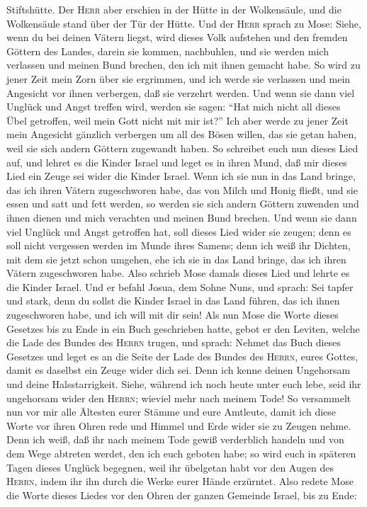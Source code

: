 Stiftshütte.  Der \textsc{Herr} aber erschien in der
Hütte in der Wolkensäule, und die Wolkensäule stand über der Tür der
Hütte.  Und der \textsc{Herr} sprach zu Mose: Siehe, wenn
du bei deinen Vätern liegst, wird dieses Volk aufstehen und den fremden
Göttern des Landes, darein sie kommen, nachbuhlen, und sie werden mich
verlassen und meinen Bund brechen, den ich mit ihnen gemacht habe.
 So wird zu jener Zeit mein Zorn über sie ergrimmen, und
ich werde sie verlassen und mein Angesicht vor ihnen verbergen, daß sie
verzehrt werden. Und wenn sie dann viel Unglück und Angst treffen wird,
werden sie sagen: ``Hat mich nicht all dieses Übel getroffen, weil mein
Gott nicht mit mir ist?''  Ich aber werde zu jener Zeit
mein Angesicht gänzlich verbergen um all des Bösen willen, das sie getan
haben, weil sie sich andern Göttern zugewandt haben.  So
schreibet euch nun dieses Lied auf, und lehret es die Kinder Israel und
leget es in ihren Mund, daß mir dieses Lied ein Zeuge sei wider die
Kinder Israel.  Wenn ich sie nun in das Land bringe, das
ich ihren Vätern zugeschworen habe, das von Milch und Honig fließt, und
sie essen und satt und fett werden, so werden sie sich andern Göttern
zuwenden und ihnen dienen und mich verachten und meinen Bund brechen.
 Und wenn sie dann viel Unglück und Angst getroffen hat,
soll dieses Lied wider sie zeugen; denn es soll nicht vergessen werden
im Munde ihres Samens; denn ich weiß ihr Dichten, mit dem sie jetzt
schon umgehen, ehe ich sie in das Land bringe, das ich ihren Vätern
zugeschworen habe.  Also schrieb Mose damals dieses Lied
und lehrte es die Kinder Israel.  Und er befahl Josua,
dem Sohne Nuns, und sprach: Sei tapfer und stark, denn du sollst die
Kinder Israel in das Land führen, das ich ihnen zugeschworen habe, und
ich will mit dir sein!  Als nun Mose die Worte dieses
Gesetzes bis zu Ende in ein Buch geschrieben hatte, 
gebot er den Leviten, welche die Lade des Bundes des \textsc{Herrn}
trugen, und sprach:  Nehmet das Buch dieses Gesetzes und
leget es an die Seite der Lade des Bundes des \textsc{Herrn}, eures
Gottes, damit es daselbst ein Zeuge wider dich sei.  Denn
ich kenne deinen Ungehorsam und deine Halsstarrigkeit. Siehe, während
ich noch heute unter euch lebe, seid ihr ungehorsam wider den
\textsc{Herrn}; wieviel mehr nach meinem Tode!  So
versammelt nun vor mir alle Ältesten eurer Stämme und eure Amtleute,
damit ich diese Worte vor ihren Ohren rede und Himmel und Erde wider sie
zu Zeugen nehme.  Denn ich weiß, daß ihr nach meinem Tode
gewiß verderblich handeln und von dem Wege abtreten werdet, den ich euch
geboten habe; so wird euch in späteren Tagen dieses Unglück begegnen,
weil ihr übelgetan habt vor den Augen des \textsc{Herrn}, indem ihr ihn
durch die Werke eurer Hände erzürntet.  Also redete Mose
die Worte dieses Liedes vor den Ohren der ganzen Gemeinde Israel, bis zu
Ende:

